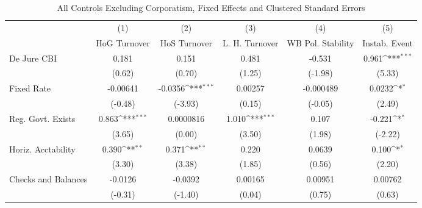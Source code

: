 \begin{table}[htbp]\centering
\def\sym#1{\ifmmode^{#1}\else\(^{#1}\)\fi}
\caption{All Controls Excluding Corporatism, Fixed Effects and Clustered Standard Errors \label{nccmultIndFEDJ}}
\begin{tabular}{l*{5}{c}}
\toprule
                                        &\multicolumn{1}{c}{(1)}&\multicolumn{1}{c}{(2)}&\multicolumn{1}{c}{(3)}&\multicolumn{1}{c}{(4)}&\multicolumn{1}{c}{(5)}\\
                                        &\multicolumn{1}{c}{HoG Turnover}&\multicolumn{1}{c}{HoS Turnover}&\multicolumn{1}{c}{L. H. Turnover}&\multicolumn{1}{c}{WB Pol. Stability}&\multicolumn{1}{c}{Instab. Event}\\
\midrule
De Jure CBI                             &    0.181         &    0.151         &    0.481         &   -0.531         &    0.961\sym{***}\\
                                        &   (0.62)         &   (0.70)         &   (1.25)         &  (-1.98)         &   (5.33)         \\
\addlinespace
Fixed Rate                              & -0.00641         &  -0.0356\sym{***}&  0.00257         &-0.000489         &   0.0232\sym{*}  \\
                                        &  (-0.48)         &  (-3.93)         &   (0.15)         &  (-0.05)         &   (2.49)         \\
\addlinespace
Reg. Govt. Exists                       &    0.863\sym{***}&0.0000816         &    1.010\sym{***}&    0.107         &   -0.221\sym{*}  \\
                                        &   (3.65)         &   (0.00)         &   (3.50)         &   (1.98)         &  (-2.22)         \\
\addlinespace
Horiz. Acctability                      &    0.390\sym{**} &    0.371\sym{**} &    0.220         &   0.0639         &    0.100\sym{*}  \\
                                        &   (3.30)         &   (3.38)         &   (1.85)         &   (0.56)         &   (2.20)         \\
\addlinespace
Checks and Balances                     &  -0.0126         &  -0.0392         &  0.00165         &  0.00951         &  0.00762         \\
                                        &  (-0.31)         &  (-1.40)         &   (0.04)         &   (0.75)         &   (0.63)         \\

\end{tabular}
\end{table}
